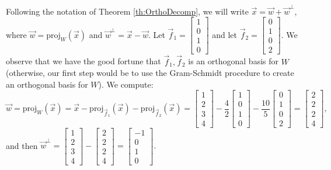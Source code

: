 \documentclass{ximera}
\begin{document}
\begin{example}
  \begin{explanation}
   Following the notation of Theorem \ref{th:OrthoDecomp}, we will write $\vec{x} = \vec{w} + \vec{w}^\perp$, where $\vec{w}=\mbox{proj}_W(\vec{x})$ and $\vec{w}^\perp = \vec{x} - \vec{w}$.  Let $\vec{f}_1=\begin{bmatrix}
  1 \\ 0 \\ 1 \\ 0
  \end{bmatrix}$ and let $\vec{f}_2=\begin{bmatrix}
  0 \\ 1 \\ 0 \\ 2
  \end{bmatrix}$.  We observe that we have the good fortune that $\vec{f}_1,\vec{f}_2$ is an orthogonal basis for $W$ (otherwise, our first step would be to use the Gram-Schmidt procedure to create an orthogonal basis for $W$).  We compute:
$$\vec{w}=\mbox{proj}_W(\vec{x})
      =\vec{x}-\mbox{proj}_{\vec{f}_1}(\vec{x})-\mbox{proj}_{\vec{f}_2}(\vec{x})
      = \begin{bmatrix}
  1 \\ 2 \\ 3 \\ 4
  \end{bmatrix} - \frac{4}{2}\begin{bmatrix}
  1 \\ 0 \\ 1 \\ 0
  \end{bmatrix} - \frac{10}{5}\begin{bmatrix}
  0 \\ 1 \\ 0 \\ 2
  \end{bmatrix} = \begin{bmatrix}
  2 \\ 2 \\ 2 \\ 4
  \end{bmatrix},$$
  and then $\vec{w}^\perp=\begin{bmatrix}
  1 \\ 2 \\ 3 \\ 4
  \end{bmatrix} - \begin{bmatrix}
  2 \\ 2 \\ 2 \\ 4
  \end{bmatrix} = \begin{bmatrix}
  -1 \\ 0 \\ 1 \\ 0
  \end{bmatrix}.$
  \end{explanation}
  \end{example}
  
\end{document}
